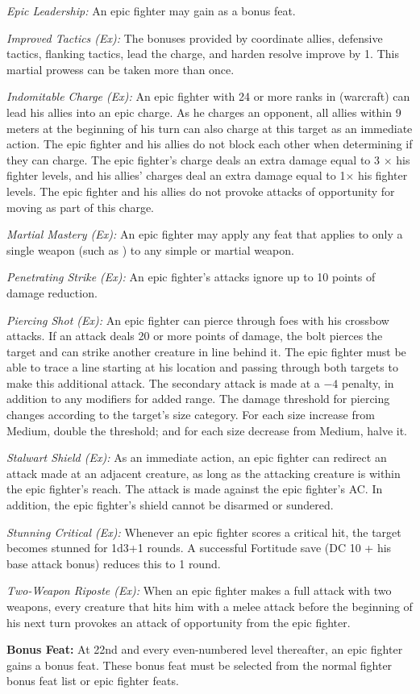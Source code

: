 \textit{Epic Leadership:} An epic fighter may gain  as a bonus feat.

\textit{Improved Tactics (Ex):} The bonuses provided by coordinate allies, defensive tactics, flanking tactics, lead the charge, and harden resolve improve by 1. This martial prowess can be taken more than once.

\textit{Indomitable Charge (Ex):} An epic fighter with 24 or more ranks in  (warcraft) can lead his allies into an epic charge. As he charges an opponent, all allies within 9 meters at the beginning of his turn can also charge at this target as an immediate action. The epic fighter and his allies do not block each other when determining if they can charge. The epic fighter's charge deals an extra damage equal to 3 $\times$ his fighter levels, and his allies' charges deal an extra damage equal to 1\onehalf $\times$ his fighter levels. The epic fighter and his allies do not provoke attacks of opportunity for moving as part of this charge.

\textit{Martial Mastery (Ex):} An epic fighter may apply any feat that applies to only a single weapon (such as ) to any simple or martial weapon.

\textit{Penetrating Strike (Ex):} An epic fighter's attacks ignore up to 10 points of damage reduction.

\textit{Piercing Shot (Ex):} An epic fighter can pierce through foes with his crossbow attacks. If an attack deals 20 or more points of damage, the bolt pierces the target and can strike another creature in line behind it. The epic fighter must be able to trace a line starting at his location and passing through both targets to make this additional attack. The secondary attack is made at a $-4$ penalty, in addition to any modifiers for added range. The damage threshold for piercing changes according to the target's size category. For each size increase from Medium, double the threshold; and for each size decrease from Medium, halve it.

\textit{Stalwart Shield (Ex):} As an immediate action, an epic fighter can redirect an attack made at an adjacent creature, as long as the attacking creature is within the epic fighter's reach. The attack is made against the epic fighter's AC. In addition, the epic fighter's shield cannot be disarmed or sundered.

\textit{Stunning Critical (Ex):} Whenever an epic fighter scores a critical hit, the target becomes stunned for 1d3+1 rounds. A successful Fortitude save (DC 10 + his base attack bonus) reduces this to 1 round.

\textit{Two-Weapon Riposte (Ex):} When an epic fighter makes a full attack with two weapons, every creature that hits him with a melee attack before the beginning of his next turn provokes an attack of opportunity from the epic fighter.


\textbf{Bonus Feat:} At 22nd and every even-numbered level thereafter, an epic fighter gains a bonus feat. These bonus feat must be selected from the normal fighter bonus feat list or epic fighter feats.
